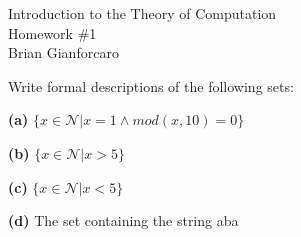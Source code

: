

\topmargin-2cm     %
\textwidth16.5cm   %

\newcommand{\question}[2] {\vspace{.25in} \fbox{#1} #2 \vspace{.10in}}
\renewcommand{\part}[1] {\vspace{.10in} {\bf (#1)}}



\medskip                        %


\begin{center}                  %
  {\Large Introduction to the Theory of Computation \\ Homework \#1} \\
  Brian Gianforcaro \\
  \date \\
\end{center}

\ttfamily

\question{1}{Write formal descriptions of the following sets:}

\part{a} $\{ x \in {\mathcal{N}} | x = 1 \wedge mod(x,10) = 0 \}$

\part{b} $\{ x \in {\mathcal{N}} | x > 5 \}$

\part{c} $\{ x \in {\mathcal{N}} | x < 5 \}$

\part{d} The set containing the string aba 

